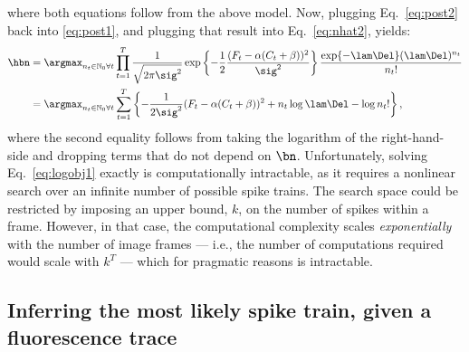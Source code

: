 where both equations follow from the above model.  Now, plugging Eq.~\eqref{eq:post2} back into \eqref{eq:post1}, and plugging that result into Eq.~\eqref{eq:nhat2}, yields:
\begin{subequations}  \label{eq:obj}
\begin{align}
\hbn 	&= \anx \prod_{t=1}^T \frac{1}{\sqrt{2 \pi \sig^2}} \exp \left\{-\frac{1}{2}\frac{(F_t - \alpha (C_t + \beta))^2}{\sig^2}\right\} \frac{\exp\{-\lam\Del\} (\lam\Del)^{n_t}}{n_t!}
\label{eq:obj1}\\ &= \anx  \sum_{t=1}^T \left\{ -\frac{1}{2 \sig^2}(F_t - \alpha(C_t + \beta))^2  +  n_t \log \lam \Del - \log n_t! \right\}, \label{eq:logobj1}
\end{align} 
\end{subequations}
\noindent where the second equality follows from taking the logarithm of the right-hand-side and dropping terms that do not depend on $\bn$.  Unfortunately, solving Eq.~\eqref{eq:logobj1} exactly is computationally intractable, as it requires a nonlinear search over an infinite number of  possible spike trains.  The search space could be restricted by imposing an upper bound, $k$, on the number of spikes within a frame.  However, in that case, the computational complexity scales \emph{exponentially} with the number of image frames --- i.e.,  the number of computations required would scale with $k^T$ --- which for pragmatic reasons is intractable.




\subsection{Inferring the most likely spike train, given a fluorescence trace} \label{sec:inf}

